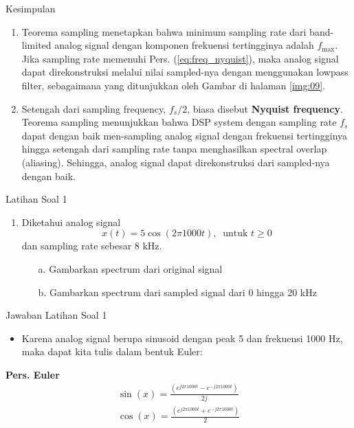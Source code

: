 \documentclass[pdflatex,compress,mathserif]{beamer}
\begin{document}
\begin{frame}{Kesimpulan}
    \begin{enumerate}
        \item Teorema sampling menetapkan bahwa minimum sampling rate dari band-limited analog signal dengan komponen frekuensi tertingginya adalah $f_{\text{max}}$. Jika sampling rate memenuhi Pers. (\ref{eq:freq_nyquist}), maka analog signal dapat direkonstruksi melalui nilai sampled-nya dengan menggunakan lowpass filter, sebagaimana yang ditunjukkan oleh Gambar di halaman \ref{img:09}.
        \item Setengah dari sampling frequency, $f_s / 2$, biasa disebut \textbf{Nyquist frequency}. Teorema sampling menunjukkan bahwa DSP system dengan sampling rate $f_s$ dapat dengan baik men-sampling analog signal dengan frekuensi tertingginya hingga setengah dari sampling rate tanpa menghasilkan spectral overlap (aliasing). Sehingga, analog signal dapat direkonstruksi dari sampled-nya dengan baik.
    \end{enumerate}
\end{frame}

\begin{frame}{Latihan Soal 1}
    \begin{enumerate}
        \item Diketahui analog signal
        \begin{equation*}
            x(t) = 5 \cos (2 \pi 1000 t),~\text{ untuk } t \geq 0
        \end{equation*}
        dan sampling rate sebesar 8 kHz.
        \begin{enumerate}
            \item[a.] Gambarkan spectrum dari original signal
            \item[b.] Gambarkan spectrum dari sampled signal dari 0 hingga 20 kHz
        \end{enumerate}
    \end{enumerate}
\end{frame}

\begin{frame}{Jawaban Latihan Soal 1}
    \begin{itemize}
        \item Karena analog signal berupa sinusoid dengan peak 5 dan frekuensi 1000 Hz, maka dapat kita tulis dalam bentuk Euler:
    \end{itemize}
    \begin{framed}
    \textbf{Pers. Euler}
        \begin{align}
            \sin(x) = \frac{(e^{j2\pi 1000t} - e^{-j2\pi 1000t})}{2j} \\
            \cos(x) = \frac{(e^{j2\pi 1000t} + e^{-j2\pi 1000t})}{2}
        \end{align}
    \end{framed}
\end{frame}
\end{document}
